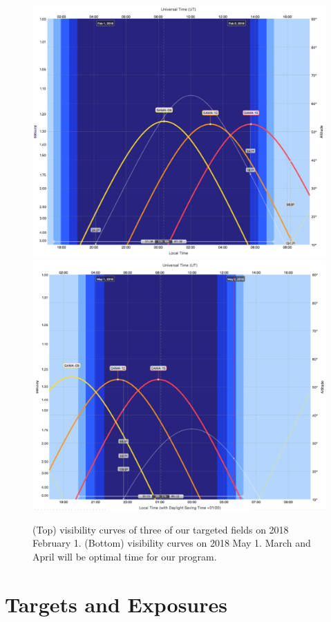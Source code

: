 \documentclass[letterpaper,12pt]{article}
\begin{document}
\begin{figure}[hbt]
\includegraphics[width=5in]{visibility/visibility_feb.pdf}
\includegraphics[width=5in]{visibility/visibility_may.pdf}
\caption{(Top) visibility curves of three of our targeted fields on 2018 February 1. (Bottom) visibility curves on 2018
May 1. March and April will be optimal time for our program.}
\end{figure}

\clearpage

\section{Targets and Exposures}
\end{document}
